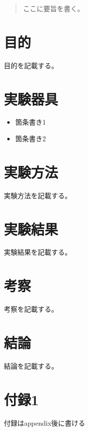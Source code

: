 \documentclass[titlepage]{jlreq}
\begin{document}
\begin{abstract}

ここに要旨を書く。

\end{abstract} 


\section{目的}

目的を記載する。

\section{実験器具}

\begin{itemize}
    \item 箇条書き1
    \item 箇条書き2
\end{itemize}

\section{実験方法}

実験方法を記載する。

\section{実験結果}

実験結果を記載する。

\section{考察}

考察を記載する。

\section{結論}

結論を記載する。






\appendix

\section{付録1}

付録はappendix後に書ける
\end{document}

